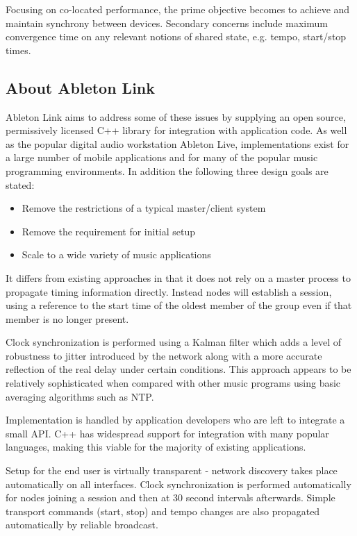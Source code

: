 \documentclass[11pt]{article} %
\theoremstyle{plain}
\theoremstyle{definition}
\begin{document}
Focusing on co-located performance, the prime objective becomes to achieve and
maintain synchrony between devices. Secondary concerns include maximum
convergence time on any relevant notions of shared state, e.g. tempo,
start/stop times.

\subsection{About Ableton Link}

Ableton Link aims to address some of these issues by supplying an open source,
permissively licensed C++ library for integration with application code. As
well as the popular digital audio workstation Ableton Live, implementations
exist for a large number of mobile applications and for many of the popular
music programming environments. In addition the following three design goals are
stated\cite{goltz2018ableton}:

\begin{itemize}
  \item Remove the restrictions of a typical master/client system
  \item Remove the requirement for initial setup
  \item Scale to a wide variety of music applications
\end{itemize}

It differs from existing approaches in that it does not rely on a master
process to propagate timing information directly. Instead nodes will establish
a session, using a reference to the start time of the oldest member of the
group even if that member is no longer present.

Clock synchronization is performed using a Kalman
filter which adds a level of robustness to jitter
introduced by the network along with a more accurate reflection of the real
delay under certain conditions. This approach appears to be relatively
sophisticated when compared with other music programs using basic averaging
algorithms such as NTP\cite{bletsas2005evaluation}.

Implementation is handled by application developers who are left to integrate a
small API. C++ has widespread support for integration with many popular
languages, making this viable for the majority of existing applications.

Setup for the end user is virtually transparent - network discovery takes place
automatically on all interfaces. Clock synchronization is performed
automatically for nodes joining a session and then at 30 second intervals
afterwards. Simple transport commands (start, stop) and tempo changes are also
propagated automatically by reliable broadcast.
\end{document}
